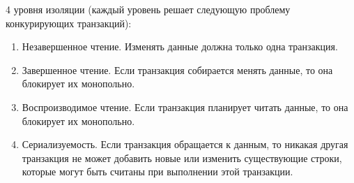 4 уровня изоляции (каждый уровень решает следующую проблему конкурирующих
транзакций):
\begin{enumerate}
\item
  Незавершенное чтение. Изменять данные должна только одна транзакция.

\item
  Завершенное чтение. Если транзакция собирается менять данные, то она блокирует
  их монопольно.

\item
  Воспроизводимое чтение. Если транзакция планирует читать  данные, то она
  блокирует их монопольно.

\item
  Сериализуемость. Если транзакция обращается к данным, то никакая другая
  транзакция не может добавить новые или изменить существующие строки, которые
  могут быть считаны при выполнении этой транзакции.
\end{enumerate}